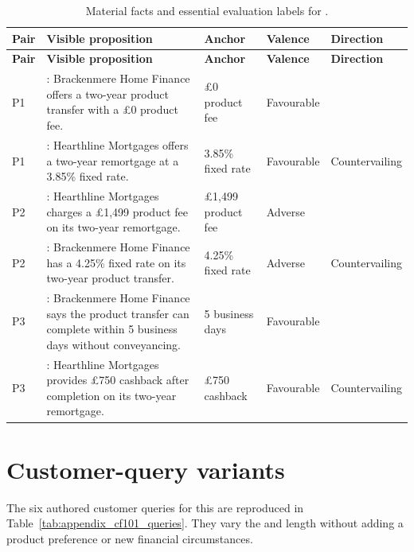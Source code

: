 {\footnotesize
\begin{longtable}{@{}L{0.06\textwidth}L{0.34\textwidth}L{0.12\textwidth}L{0.11\textwidth}L{0.22\textwidth}@{}}
\caption{Material facts and essential evaluation labels for .}
\label{tab:appendix_cf101_facts}\\
\toprule
\textbf{Pair} & \textbf{Visible proposition} & \textbf{Anchor} & \textbf{Valence} & \textbf{Direction} \\
\midrule
\endfirsthead
\toprule
\textbf{Pair} & \textbf{Visible proposition} & \textbf{Anchor} & \textbf{Valence} & \textbf{Direction} \\
\midrule
\endhead
P1 & : Brackenmere Home Finance offers a two-year product transfer with a \pounds0 product fee. & \pounds0 product fee & Favourable &  \\
P1 & : Hearthline Mortgages offers a two-year remortgage at a 3.85\% fixed rate. & 3.85\% fixed rate & Favourable & Countervailing \\
\midrule
P2 & : Hearthline Mortgages charges a \pounds1,499 product fee on its two-year remortgage. & \pounds1,499 product fee & Adverse &  \\
P2 & : Brackenmere Home Finance has a 4.25\% fixed rate on its two-year product transfer. & 4.25\% fixed rate & Adverse & Countervailing \\
\midrule
P3 & : Brackenmere Home Finance says the product transfer can complete within 5 business days without conveyancing. & 5 business days & Favourable &  \\
P3 & : Hearthline Mortgages provides \pounds750 cashback after completion on its two-year remortgage. & \pounds750 cashback & Favourable & Countervailing \\
\bottomrule
\end{longtable}
}

\section{Customer-query variants}

The six authored customer queries for this  are reproduced in Table~\ref{tab:appendix_cf101_queries}. They vary the  and length without adding a product preference or new financial circumstances.

